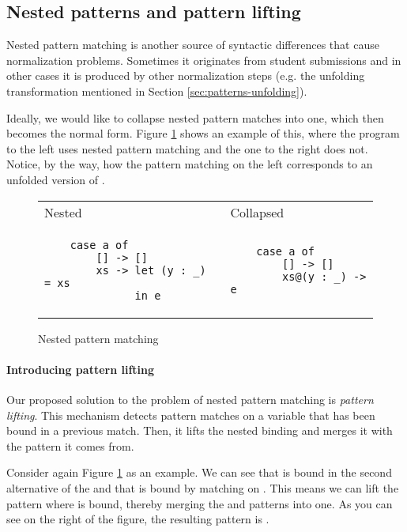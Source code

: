 \subsection{Nested patterns and pattern lifting}

Nested pattern matching is another source of syntactic differences that cause normalization problems. Sometimes it originates from student submissions and in other cases it is produced by other normalization steps (e.g. the unfolding transformation mentioned in Section \ref{sec:patterns-unfolding}).

Ideally, we would like to collapse nested pattern matches into one, which then becomes the normal form. Figure \ref{fig:patterns-nested-matching} shows an example of this, where the program to the left uses nested pattern matching and the one to the right does not. Notice, by the way, how the pattern matching on the left corresponds to an unfolded version of .

\begin{figure}
\centering
\begin{tabular}{ >{\centering\arraybackslash}m{17em} >{\centering\arraybackslash}m{13em} }
    Nested & Collapsed \\
    \begin{verbatim}
    case a of
        [] -> []
        xs -> let (y : _) = xs
              in e
    \end{verbatim}
    &
    \begin{verbatim}
    case a of
        [] -> []
        xs@(y : _) -> e
    \end{verbatim}
\end{tabular}
\caption{Nested pattern matching}
\label{fig:patterns-nested-matching}
\end{figure}

\paragraph{Introducing pattern lifting}

Our proposed solution to the problem of nested pattern matching is \emph{pattern lifting}. This mechanism detects pattern matches on a variable that has been bound in a previous match. Then, it lifts the nested binding and merges it with the pattern it comes from.

Consider again Figure \ref{fig:patterns-nested-matching} as an example. We can see that  is bound in the second alternative of the  and that  is bound by matching on . This means we can lift the pattern where  is bound, thereby merging the  and  patterns into one. As you can see on the right of the figure, the resulting pattern is .

